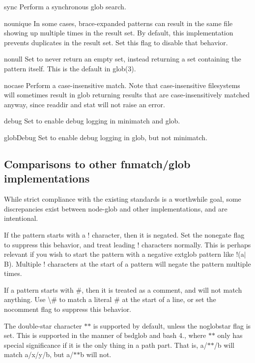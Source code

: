 \begin{DoxyItemize}
\item {\ttfamily sync} Perform a synchronous glob search.
\item {\ttfamily nounique} In some cases, brace-\/expanded patterns can result in the same file showing up multiple times in the result set. By default, this implementation prevents duplicates in the result set. Set this flag to disable that behavior.
\item {\ttfamily nonull} Set to never return an empty set, instead returning a set containing the pattern itself. This is the default in glob(3).
\item {\ttfamily nocase} Perform a case-\/insensitive match. Note that case-\/insensitive filesystems will sometimes result in glob returning results that are case-\/insensitively matched anyway, since readdir and stat will not raise an error.
\item {\ttfamily debug} Set to enable debug logging in minimatch and glob.
\item {\ttfamily glob\+Debug} Set to enable debug logging in glob, but not minimatch.
\end{DoxyItemize}

\subsection*{Comparisons to other fnmatch/glob implementations}

While strict compliance with the existing standards is a worthwhile goal, some discrepancies exist between node-\/glob and other implementations, and are intentional.

If the pattern starts with a {\ttfamily !} character, then it is negated. Set the {\ttfamily nonegate} flag to suppress this behavior, and treat leading {\ttfamily !} characters normally. This is perhaps relevant if you wish to start the pattern with a negative extglob pattern like {\ttfamily !(a$\vert$B)}. Multiple {\ttfamily !} characters at the start of a pattern will negate the pattern multiple times.

If a pattern starts with {\ttfamily \#}, then it is treated as a comment, and will not match anything. Use {\ttfamily \textbackslash{}\#} to match a literal {\ttfamily \#} at the start of a line, or set the {\ttfamily nocomment} flag to suppress this behavior.

The double-\/star character {\ttfamily $\ast$$\ast$} is supported by default, unless the {\ttfamily noglobstar} flag is set. This is supported in the manner of bsdglob and bash 4., where {\ttfamily $\ast$$\ast$} only has special significance if it is the only thing in a path part. That is, {\ttfamily a/$\ast$$\ast$/b} will match {\ttfamily a/x/y/b}, but {\ttfamily a/$\ast$$\ast$b} will not.

